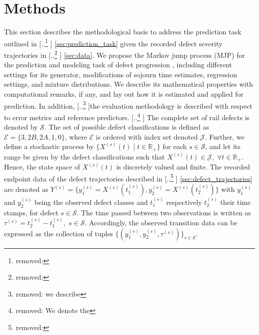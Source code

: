 \documentclass{article}
\providecommand{\DIFadd}[1]{{\protect\color{blue} \sf #1}} %
\providecommand{\DIFdel}[1]{{\protect\color{red} [..\footnote{removed: #1} ]}} %
\providecommand{\DIFaddbegin}{} %
\providecommand{\DIFaddend}{} %
\providecommand{\DIFdelbegin}{} %
\providecommand{\DIFdelend}{} %
\begin{document}
 
\section{Methods} \label{sec:methods}
This section describes the methodological basis to address the prediction task outlined in \DIFdelbegin \DIFdel{ }\DIFdelend \DIFaddbegin \DIFadd{\cref{sec:prediction_task} }\DIFaddend given the recorded defect severity trajectories in \DIFdelbegin \DIFdel{}\DIFdelend \DIFaddbegin \DIFadd{\cref{sec:data}}\DIFaddend . 
We propose the Markov jump process (MJP) for the prediction and modeling task of defect progression\DIFaddbegin \DIFadd{, including different settings for its generator, modifications of sojourn time estimates, regression settings, and mixture distributions}\DIFaddend .
We describe its mathematical properties with computational remarks, if any, and lay out how it is estimated and applied for prediction. In addition, \DIFdelbegin \DIFdel{we describe }\DIFdelend the evaluation methodology \DIFaddbegin \DIFadd{is described }\DIFaddend with respect to error metrics and reference predictors. 
\DIFdelbegin \DIFdel{We denote the }\DIFdelend \DIFaddbegin \DIFadd{The }\DIFaddend complete set of rail defects \DIFaddbegin \DIFadd{is denoted }\DIFaddend by $\mathcal{S}$. The set of possible defect classifications is defined as $\mathcal{E} = \{3, 2B, 2A, 1, 0\}$, where $\mathcal{E}$ is ordered with index set denoted $\mathcal{J}$.
Further, we define a stochastic process by $\{ X^{(s)}(t) \; \vert \; t \in \mathbb R_+\}$ for each $s \in \mathcal{S}$, and let its range be given by the defect classifications such that $ X^{(s)}(t) \in \mathcal{J}, \; \forall t \in \mathbb R_+$. Hence, the state space of $X^{(s)}(t)$ is discretely valued and finite. 
The recorded endpoint data of the defect trajectories described in \DIFdelbegin \DIFdel{ }\DIFdelend \DIFaddbegin \DIFadd{\cref{sec:defect_trajectories} }\DIFaddend are denoted as $Y^{(s)} = \{ y_1^{(s)} = X^{(s)}(t_1^{(s)}), y_2^{(s)} = X^{(s)}(t_2^{(s)}) \}$ with $y_1^{(s)}$ and $y_2^{(s)}$ being the observed defect classes and $t_1^{(s)}$ respectively $t_2^{(s)}$ their time stamps, for defect $s \in \mathcal{S}$. The time passed between two observations is written as $\tau^{(s)} = t_2^{(s)} - t_1^{(s)}, \; s \in \mathcal{S}$. Accordingly, the observed transition data can be expressed as the collection of tuples $\{ ( y_1^{(s)}, y_2^{(s)}, \tau^{(s)} ) \}_{s \in \mathcal{S}}$. 
\end{document}
